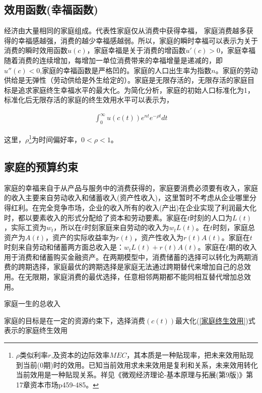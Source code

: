 \subsection{效用函数(幸福函数)}

经济由大量相同的家庭组成。代表性家庭仅从消费中获得幸福，
家庭消费越多获得的幸福感越强，消费的越少幸福感越弱。所以，家庭的瞬时幸福可以表示为关于消费的瞬时效用函数$ u(c) $，家庭幸福是关于消费的增函数$ u'(c)>0$，家庭幸福随着消费的连续增加，每增加一单位消费带来的幸福增量是递减的，即$ u''(c)<0 $,家庭的幸福函数是严格凹的。家庭的人口出生率为指数$ n $。家庭的劳动供给是无弹性（劳动供给是外生给定的）。家庭是无限存活的，无限存活的家庭目标是追求家庭终生幸福水平的最大化。为简化分析，家庭的初始人口标准化为1，标准化后无限存活的家庭的终生效用水平可以表示为，

\begin{gather}
	\int_{0}^{\infty}u(c(t))e^{nt}e^{-\rho t}dt
	\label{家庭终生效用}
\end{gather}

这里，$ \rho $\footnote{$ \rho $类似利率$ r $,及资本的边际效率$ MEC $，其本质是一种贴现率，把未来效用贴现到当前(0期)时的效用。已知当前效用求未来效用是复利和关系，未来效用转化当前效用是一种贴现关系。祥见《微观经济理论-基本原理与拓展(第9版)》第17章\quad 资本市场p459-485。}为时间偏好率，$ 0<\rho<1 $。

\subsection{家庭的预算约束}

家庭的幸福来自于从产品与服务中的消费获得的，家庭要消费必须要有收入，家庭的收入主要来自劳动收入和储蓄收入(资产性收入)，这里暂时不考虑从企业哪里分得红利。在完全竞争市场，企业的收入所有的收入(产出)在企业实现了利润最大化时，都以要素收入的形式分配给了资本和劳动要素。家庭在$ t $时刻的人口为$ L(t) $，实际工资为$ w_t $，所以在$ t $时刻家庭来自劳动的收入为$ w_t L(t) $。在$ t $时刻，家庭总资产为$ A (t)$，资产的实际收益率为$ r(t) $，资产性收入为$ r(t)A(t) $。家庭在$ t $时刻来自劳动和储蓄两方面总收入是：$ w_tL(t)+r(t)A(t) $。家庭在$ t $期的收入用于消费和储蓄购买金融资产。在两期模型中，消费储蓄的选择可以转化为两期消费的跨期选择，家庭最优的跨期选择是家庭无法通过跨期替代来增加自己的总效用。在无限期，家庭消费的最优选择，任意相邻两期都不能同相互替代增加总效用。

家庭一生的总收入

家庭的目标是在一定的资源约束下，选择消费$ (c(t)) $最大化(\ref{家庭终生效用})式表示的家庭终生效用

